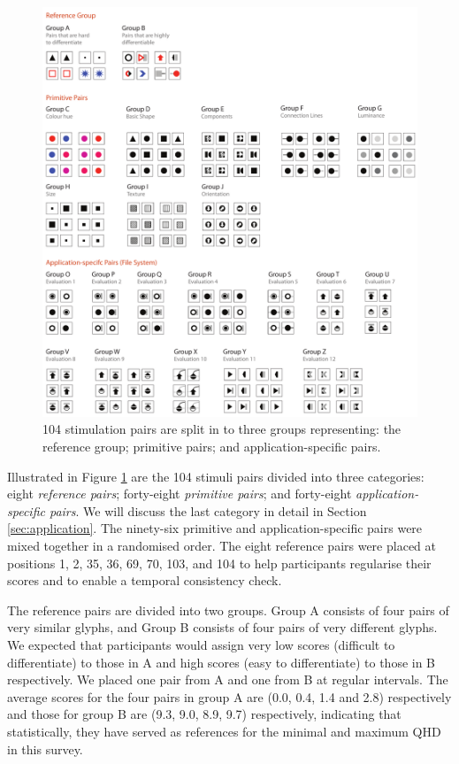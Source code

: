 \begin{figure}[t!]
\begin{center}
\includegraphics[width=\textwidth]{images/filesystem/evaluation_groups}
\end{center}
\caption{104 stimulation pairs are split in to three groups representing: the reference group; primitive pairs; and application-specific pairs.}
\label{fig:evaluation_groups}
\end{figure}


Illustrated in Figure \ref{fig:evaluation_groups} are the 104 stimuli pairs divided into three categories: eight \emph{reference pairs}; forty-eight \emph{primitive pairs}; and forty-eight \emph{application-specific pairs}.
We will discuss the last category in detail in Section \ref{sec:application}.
The ninety-six primitive and application-specific pairs were mixed together in a randomised order.
The eight reference pairs were placed at positions 1, 2, 35, 36, 69, 70, 103, and 104 to help participants regularise their scores and to enable a temporal consistency check.

The reference pairs are divided into two groups.
Group A consists of four pairs of very similar glyphs, and Group B consists of four pairs of very different glyphs. 
We expected that participants would assign very low scores (difficult to differentiate) to those in A and high scores (easy to differentiate) to those in B respectively.
We placed one pair from A and one from B at regular intervals.
The average scores for the four pairs in group A are (0.0, 0.4, 1.4 and 2.8) respectively and those for group B are (9.3, 9.0, 8.9, 9.7) respectively, indicating that statistically, they have served as references for the minimal and maximum QHD in this survey.

